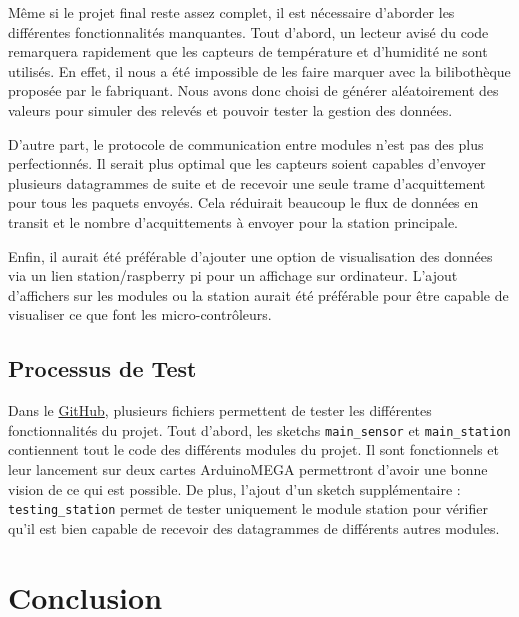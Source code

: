 \documentclass[a4paper]{article}
\begin{document}
Même si le projet final reste assez complet, il est nécessaire d'aborder les différentes fonctionnalités manquantes. 
Tout d'abord, un lecteur avisé du code remarquera rapidement que les capteurs de température et d'humidité ne sont 
utilisés. En effet, il nous a été impossible de les faire marquer avec la bilibothèque proposée par le fabriquant. 
Nous avons donc choisi de générer aléatoirement des valeurs pour simuler des relevés et pouvoir tester la gestion des données. 

\vspace{0.3cm}

D'autre part, le protocole de communication entre modules n'est pas des plus perfectionnés. Il serait plus optimal 
que les capteurs soient capables d'envoyer plusieurs datagrammes de suite et de recevoir une seule trame 
d'acquittement pour tous les paquets envoyés. Cela réduirait beaucoup le flux de données en transit et le 
nombre d'acquittements à envoyer pour la station principale. 

\vspace{0.3cm}

Enfin, il aurait été préférable d'ajouter une option de visualisation des données via un lien station/raspberry pi 
pour un affichage sur ordinateur. L'ajout d'affichers sur les modules ou la station aurait été préférable pour être 
capable de visualiser ce que font les micro-contrôleurs. 


\subsection{Processus de Test}

Dans le \href{https://github.com/winston2968/ArdyWeather.git}{GitHub}, plusieurs fichiers permettent de tester 
les différentes fonctionnalités du projet. 
Tout d'abord, les sketchs \texttt{main\_sensor} et \texttt{main\_station} contiennent tout le code des différents 
modules du projet. Il sont fonctionnels et leur lancement sur deux cartes ArduinoMEGA permettront d'avoir une bonne 
vision de ce qui est possible. 
De plus, l'ajout d'un sketch supplémentaire : \texttt{testing\_station} permet de tester uniquement le module station pour vérifier qu'il est 
bien capable de recevoir des datagrammes de différents autres modules. 




\section{Conclusion}
\end{document}
